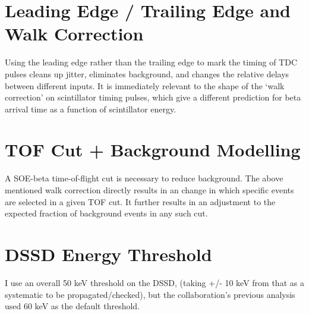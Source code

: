	
\section{Leading Edge / Trailing Edge and Walk Correction}
	Using the leading edge rather than the trailing edge to mark the timing of \ac{TDC} pulses cleans up jitter, eliminates background, and changes the relative delays between different inputs.  It is immediately relevant to the shape of the `walk correction' on scintillator timing pulses, which give a different prediction for beta arrival time as a function of scintillator energy.  %
	
\section{TOF Cut + Background Modelling}
	A SOE-beta time-of-flight cut is necessary to reduce background.  The above mentioned walk correction directly results in an change in which specific events are selected in a given TOF cut.  It further results in an adjustment to the expected fraction of background events in any such cut.
	
	

\section{DSSD Energy Threshold}
	I use an overall 50 keV threshold on the DSSD, (taking +/- 10 keV from that as a systematic to be propagated/checked), but the collaboration's previous analysis used 60 keV as the default threshold.
	
